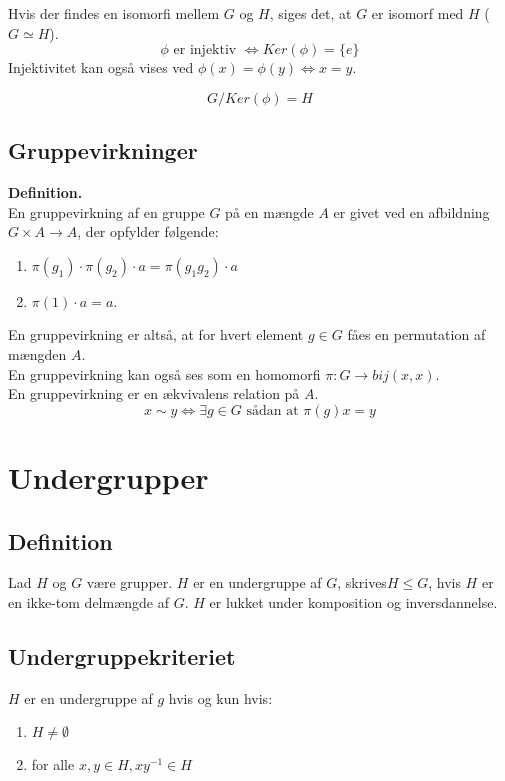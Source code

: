 \documentclass[11pt]{article}
\begin{document}
Hvis der findes en isomorfi mellem $G$ og $H$, siges det, at $G$ er isomorf med $H$ ($G \simeq H$).\\
$$\phi \text{ er injektiv } \iff Ker(\phi) = \{e\}$$
Injektivitet kan også vises ved $\phi(x) = \phi(y) \iff x = y$.

$$G / Ker(\phi) = H$$

\subsection*{Gruppevirkninger}
\textbf{Definition.}\\
En gruppevirkning af en gruppe $G$ på en mængde $A$ er givet ved en afbildning $G \times A \to A$, der opfylder følgende:\\
\begin{enumerate}
  \item $\pi(g_1) \cdot \pi(g_2) \cdot a = \pi(g_1 g_2) \cdot a$
  \item $\pi(1) \cdot a = a$.
\end{enumerate}
En gruppevirkning er altså, at for hvert element $g \in G$ fåes en permutation af mængden $A$.\\
En gruppevirkning kan også ses som en homomorfi $\pi : G \to bij(x,x)$.\\
En gruppevirkning er en ækvivalens relation på $A$.\\
$$x \sim y \iff \exists{g \in G} \text{ sådan at } \pi(g)x = y$$

\section*{Undergrupper}

\subsection*{Definition}
Lad $H$ og $G$ være grupper. $H$ er en undergruppe af $G$, skrives$H \leq G$, hvis $H$ er en ikke-tom delmængde af $G$. $H$ er lukket under komposition og inversdannelse.

\subsection*{Undergruppekriteriet}
$H$ er en undergruppe af $g$ hvis og kun hvis:
\begin{enumerate}
  \item $H \neq \emptyset$
  \item for alle $x, y \in H, x y^{-1} \in H$
\end{enumerate}
\end{document}
